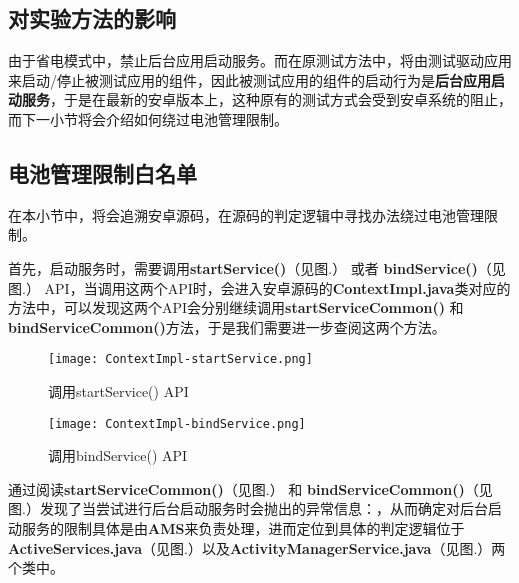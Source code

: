 \subsection{对实验方法的影响}

由于省电模式中，禁止后台应用启动服务。而在原测试方法中，将由测试驱动应用来启动/停止被测试应用的组件，因此被测试应用的组件的启动行为是\textbf{后台应用启动服务}，于是在最新的安卓版本上，这种原有的测试方式会受到安卓系统的阻止，而下一小节将会介绍如何绕过电池管理限制。

\subsection{电池管理限制白名单}

在本小节中，将会追溯安卓源码，在源码的判定逻辑中寻找办法绕过电池管理限制。

首先，启动服务时，需要调用\textbf{startService()}（见图.\redbf{\ref{fig:source code:startService}}） 或者 \textbf{bindService()}（见图.\redbf{\ref{fig:source code:bindService}}）  API，当调用这两个API时，会进入安卓源码的\textbf{ContextImpl.java}类对应的方法中，可以发现这两个API会分别继续调用\textbf{startServiceCommon()} 和\textbf{bindServiceCommon()}方法，于是我们需要进一步查阅这两个方法。

\begin{figure}[htbp]
	\centering
	\texttt{[image: ContextImpl-startService.png]} %
	\caption{调用startService() API}
	\label{fig:source code:startService}
\end{figure}

\begin{figure}[htbp]
	\centering
	\texttt{[image: ContextImpl-bindService.png]} %
	\caption{调用bindService() API}
	\label{fig:source code:bindService}
\end{figure}

通过阅读\textbf{startServiceCommon()}（见图.\redbf{\ref{fig:source code:startServiceCommon}}） 和 \textbf{bindServiceCommon()}（见图.\redbf{\ref{fig:source code:bindServiceCommon}}）发现了当尝试进行后台启动服务时会抛出的异常信息：，从而确定对后台启动服务的限制具体是由\textbf{AMS}来负责处理，进而定位到具体的判定逻辑位于\textbf{ActiveServices.java}（见图.\redbf{\ref{fig:source code:getAppStartModeLocked}}）以及\textbf{ActivityManagerService.java}（见图.\redbf{\ref{fig:source code:appRestrictedInBackgroundLocked}}）两个类中。

